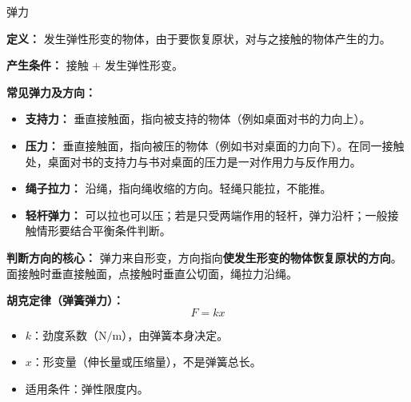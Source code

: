 \begin{conceptbox}{弹力}

\textbf{定义：} 发生弹性形变的物体，由于要恢复原状，对与之接触的物体产生的力。

\textbf{产生条件：} 接触 $+$ 发生弹性形变。

\textbf{常见弹力及方向：}
\begin{itemize}
  \item \textbf{支持力：} 垂直接触面，指向被支持的物体（例如桌面对书的力向上）。
  \item \textbf{压力：} 垂直接触面，指向被压的物体（例如书对桌面的力向下）。在同一接触处，桌面对书的支持力与书对桌面的压力是一对作用力与反作用力。
  \item \textbf{绳子拉力：} 沿绳，指向绳收缩的方向。轻绳只能拉，不能推。
  \item \textbf{轻杆弹力：} 可以拉也可以压；若是只受两端作用的轻杆，弹力沿杆；一般接触情形要结合平衡条件判断。
\end{itemize}

\textbf{判断方向的核心：} 弹力来自形变，方向指向\textbf{使发生形变的物体恢复原状的方向}。面接触时垂直接触面，点接触时垂直公切面，绳拉力沿绳。

\textbf{胡克定律（弹簧弹力）：}
\[
F = kx
\]
\begin{itemize}
  \item $k$：劲度系数（$\mathrm{N/m}$），由弹簧本身决定。
  \item $x$：形变量（伸长量或压缩量），不是弹簧总长。
  \item 适用条件：弹性限度内。
\end{itemize}

\begin{center}


\label{fig:spring-hooke}
\end{center}

\end{conceptbox}


